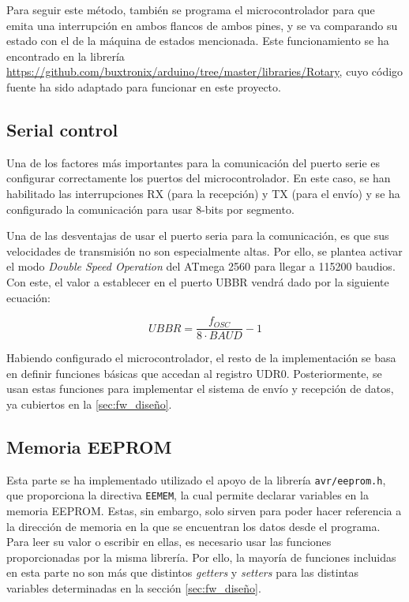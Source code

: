 Para seguir este método, también se programa el microcontrolador para que emita una interrupción en ambos flancos de ambos pines, y se va comparando su estado con el de la máquina de estados mencionada. Este funcionamiento se ha encontrado en la librería \url{https://github.com/buxtronix/arduino/tree/master/libraries/Rotary}, cuyo código fuente ha sido adaptado para funcionar en este proyecto.

\subsection{Serial control}

Una de los factores más importantes para la comunicación del puerto serie es configurar correctamente los puertos del microcontrolador. En este caso, se han habilitado las interrupciones RX (para la recepción) y TX (para el envío) y se ha configurado la comunicación para usar 8-bits por segmento.

Una de las desventajas de usar el puerto seria para la comunicación, es que sus velocidades de transmisión no son especialmente altas. Por ello, se plantea activar el modo \textit{Double Speed Operation} del ATmega 2560 para llegar a 115200 baudios. Con este, el valor a establecer en el puerto UBBR vendrá dado por la siguiente ecuación: \cite{atmega2560}

\begin{center}
    \[UBBR = \frac{f_{OSC}}{8 \cdot BAUD} - 1\]
\end{center}

Habiendo configurado el microcontrolador, el resto de la implementación se basa en definir funciones básicas que accedan al registro UDR0. Posteriormente, se usan estas funciones para implementar el sistema de envío y recepción de datos, ya cubiertos en la \ref{sec:fw_diseño}.

\subsection{Memoria EEPROM}
\label{sub:fw_eeprom}

Esta parte se ha implementado utilizado el apoyo de la librería \verb|avr/eeprom.h|, que proporciona la directiva \verb|EEMEM|, la cual permite declarar variables en la memoria EEPROM. Estas, sin embargo, solo sirven para poder hacer referencia a la dirección de memoria en la que se encuentran los datos desde el programa. Para leer su valor o escribir en ellas, es necesario usar las funciones proporcionadas por la misma librería. Por ello, la mayoría de funciones incluidas en esta parte no son más que distintos \textit{getters} y \textit{setters} para las distintas variables determinadas en la sección \ref{sec:fw_diseño}.

